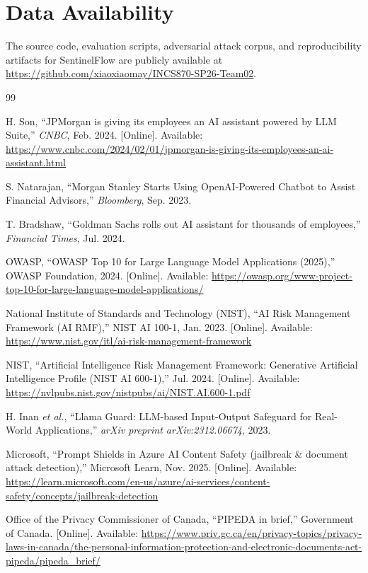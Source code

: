 \documentclass[journal]{IEEEtran}
\begin{document}
\section*{Data Availability}
The source code, evaluation scripts, adversarial attack corpus, and reproducibility artifacts for SentinelFlow are publicly available at \url{https://github.com/xiaoxiaomay/INCS870-SP26-Team02}.

\begin{thebibliography}{99}

H. Son, ``JPMorgan is giving its employees an AI assistant powered by LLM Suite,'' \textit{CNBC}, Feb. 2024. [Online]. Available: \url{https://www.cnbc.com/2024/02/01/jpmorgan-is-giving-its-employees-an-ai-assistant.html}

S. Natarajan, ``Morgan Stanley Starts Using OpenAI-Powered Chatbot to Assist Financial Advisors,'' \textit{Bloomberg}, Sep. 2023.

T. Bradshaw, ``Goldman Sachs rolls out AI assistant for thousands of employees,'' \textit{Financial Times}, Jul. 2024.

OWASP, ``OWASP Top 10 for Large Language Model Applications (2025),'' OWASP Foundation, 2024. [Online]. Available: \url{https://owasp.org/www-project-top-10-for-large-language-model-applications/}

National Institute of Standards and Technology (NIST), ``AI Risk Management Framework (AI RMF),'' NIST AI 100-1, Jan. 2023. [Online]. Available: \url{https://www.nist.gov/itl/ai-risk-management-framework}

NIST, ``Artificial Intelligence Risk Management Framework: Generative Artificial Intelligence Profile (NIST AI 600-1),'' Jul. 2024. [Online]. Available: \url{https://nvlpubs.nist.gov/nistpubs/ai/NIST.AI.600-1.pdf}

H. Inan \textit{et al.}, ``Llama Guard: LLM-based Input-Output Safeguard for Real-World Applications,'' \textit{arXiv preprint arXiv:2312.06674}, 2023.

Microsoft, ``Prompt Shields in Azure AI Content Safety (jailbreak \& document attack detection),'' Microsoft Learn, Nov. 2025. [Online]. Available: \url{https://learn.microsoft.com/en-us/azure/ai-services/content-safety/concepts/jailbreak-detection}

Office of the Privacy Commissioner of Canada, ``PIPEDA in brief,'' Government of Canada. [Online]. Available: \url{https://www.priv.gc.ca/en/privacy-topics/privacy-laws-in-canada/the-personal-information-protection-and-electronic-documents-act-pipeda/pipeda_brief/}


\end{thebibliography}
\end{document}
